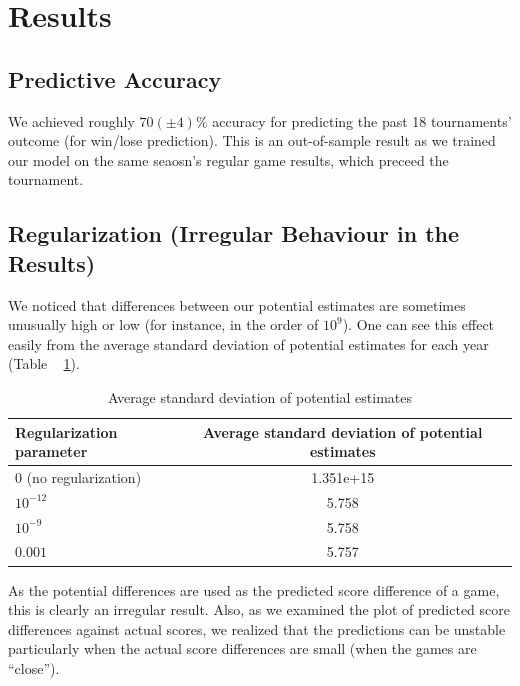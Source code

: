 \documentclass{article} %
\begin{document}
\section{Results}
\subsection{Predictive Accuracy}
We achieved roughly $70(\pm4)\%$ accuracy for predicting the past 18 tournaments' outcome (for win/lose prediction).  This is an out-of-sample result as we trained our model on the same seaosn's regular game results, which preceed the tournament.
\subsection{Regularization (Irregular Behaviour in the Results)}
We noticed that differences between our potential estimates are sometimes unusually high or low (for instance, in the order of $10^9$).  One can see this effect easily from the average standard deviation of potential estimates for each year (Table ~ \ref{table:std}).

\begin{table}
\begin{center}
	\begin{tabular}{ | l | c | r | }
		\hline
		Regularization parameter & Average standard deviation of potential estimates \\ \hline
		0 (no regularization) & 1.351e+15 \\ \hline
		$10^{-12}$ & 5.758\\ \hline
		$10^{-9}$ & 5.758\\ \hline
		$0.001$ & 5.757\\
		\hline
	\end{tabular}
	\caption{Average standard deviation of potential estimates}
	\label{table:std}
\end{center}
\end{table}

As the potential differences are used as the predicted score difference of a game, this is clearly an irregular result.  Also, as we examined the plot of predicted score differences against actual scores, we realized that the predictions can be unstable particularly when the actual score differences are small (when the games are ``close''). 
\end{document}
